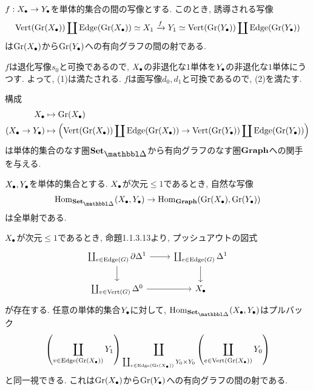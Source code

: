 \documentclass[uplatex, a4paper, 14Q, dvipdfmx]{jsreport}
\begin{document}
\begin{prop}
  $f: X_\bullet \to Y_\bullet$を単体的集合の間の写像とする. 
  このとき, 誘導される写像
  \begin{align*}
    \mathrm{Vert}(\mathrm{Gr}(X_\bullet)) \coprod \mathrm{Edge}(\mathrm{Gr}(X_\bullet)) \simeq X_1 
    \xrightarrow{f} Y_1 \simeq \mathrm{Vert}(\mathrm{Gr}(Y_\bullet)) \coprod \mathrm{Edge}(\mathrm{Gr}(Y_\bullet))
  \end{align*}
  は$\mathrm{Gr}(X_\bullet)$から$\mathrm{Gr}(Y_\bullet)$への有向グラフの間の射である. 
\end{prop}

\begin{Proof}
  $f$は退化写像$s_0$と可換であるので, $X_\bullet$の非退化な$1$単体を$Y_\bullet$の非退化な$1$単体にうつす. 
  よって, (1)は満たされる. 
  $f$は面写像$d_0, d_1$と可換であるので, (2)を満たす.
\end{Proof}

構成
\begin{align*}
  X_\bullet &\mapsto \mathrm{Gr}(X_\bullet) \\
  (X_\bullet \to Y_\bullet) &\mapsto \qty( \mathrm{Vert}(\mathrm{Gr}(X_\bullet)) \coprod \mathrm{Edge}(\mathrm{Gr}(X_\bullet)) \to \mathrm{Vert}(\mathrm{Gr}(Y_\bullet)) \coprod \mathrm{Edge}(\mathrm{Gr}(Y_\bullet)) )
\end{align*}
は単体的集合のなす圏$\sset$から有向グラフのなす圏$\mathbf{Graph}$への関手を与える. 

\begin{prop}
  $X_\bullet,Y_\bullet$を単体的集合とする. 
  $X_\bullet$が次元$\leq 1$であるとき, 自然な写像
  \begin{align*}
    \Hom_{\sset}(\X,\Y) \to \Hom_{\gra}(\gr(\X),\gr(\Y))
  \end{align*}
  は全単射である. 
\end{prop}

\begin{Proof}
  $X_\bullet$が次元$\leq 1$であるとき, 命題1.1.3.13より, プッシュアウトの図式
  \[\begin{tikzcd}
    {\coprod_{e \in \Edge(G)} \del \Delta^1} & {\coprod_{e \in \Edge(G)} \Delta^1} \\
    {\coprod_{v \in \Vert(G)} \Delta^0 } & \X
    \arrow[from=1-1, to=1-2]
    \arrow[from=1-1, to=2-1]
    \arrow[from=2-1, to=2-2]
    \arrow[from=1-2, to=2-2]
  \end{tikzcd}\]
  が存在する. 
  任意の単体的集合$Y_\bullet$に対して, $\Hom_{\sset}(\X,\Y)$はプルバック
  \begin{align*}
    \qty( \coprod_{v \in \mathrm{Edge}(\mathrm{Gr}(X_\bullet))} Y_1) 
    \coprod_{\coprod_{e \in \mathrm{Edge}(\mathrm{Gr}(X_\bullet))} Y_0 \times Y_0} 
    \qty( \coprod_{e \in \mathrm{Vert}(\mathrm{Gr}(X_\bullet))} Y_0 )
  \end{align*}
  と同一視できる. 
  これは$\mathrm{Gr}(X_\bullet)$から$\mathrm{Gr}(Y_\bullet)$への有向グラフの間の射である. 
\end{Proof}
\end{document}
